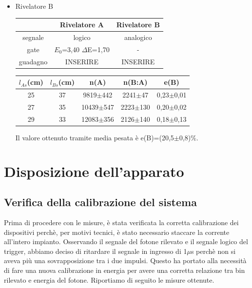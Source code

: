 \documentclass[italian,11pt]{report}
\begin{document}
\begin{itemize}
    \item Rivelatore B
      \begin{center}
    \centering
    \begin{tabular}{ccc}
    \hline
    & Rivelatore A& Rivelatore B\\
    \hline\hline
    segnale& logico& analogico\\
    gate& $E_{0}$=3,40  $\Delta$E=1,70& -\\
    guadagno& INSERIRE& INSERIRE\\
    \hline
    \end{tabular}
    \end{center}
  \vspace{0.3cm}   
   \begin{center}
    \centering
    \begin{tabular}{ccccc}
    \hline
    $l_{As}$(cm)& $l_{Bs}$(cm)& n(A) &  n(B:A)& e(B)\\
    \hline\hline
    25& 37& 9819$\pm$442& 2241$\pm$47 & 0,23$\pm$0,01\\
    27& 35& 10439$\pm$547& 2223$\pm$130& 0,20$\pm$0,02\\
    29& 33& 12083$\pm$356& 2126$\pm$140& 0,18$\pm$0,13\\
    \hline
    \end{tabular}
    \end{center}
Il valore ottenuto tramite media pesata è e(B)=(20,5$\pm$0,8)$\%$.
\end{itemize}

\chapter{Disposizione dell'apparato}
\section{Verifica della calibrazione del sistema}
Prima di procedere con le misure, è stata verificata la corretta calibrazione dei dispositivi perchè, per motivi tecnici, è stato necessario staccare la corrente all'intero impianto. Osservando il segnale del fotone rilevato e il segnale logico del trigger, abbiamo deciso di ritardare il segnale in ingresso di 1$\mu$s perchè non si aveva più una sovrapposizione tra i due impulsi. Questo ha portato alla necessità di fare una nuova calibrazione in energia per avere una corretta relazione tra bin rilevato e energia del fotone. Riportiamo di seguito le misure ottenute.
\vspace{3mm}  
\end{document}

